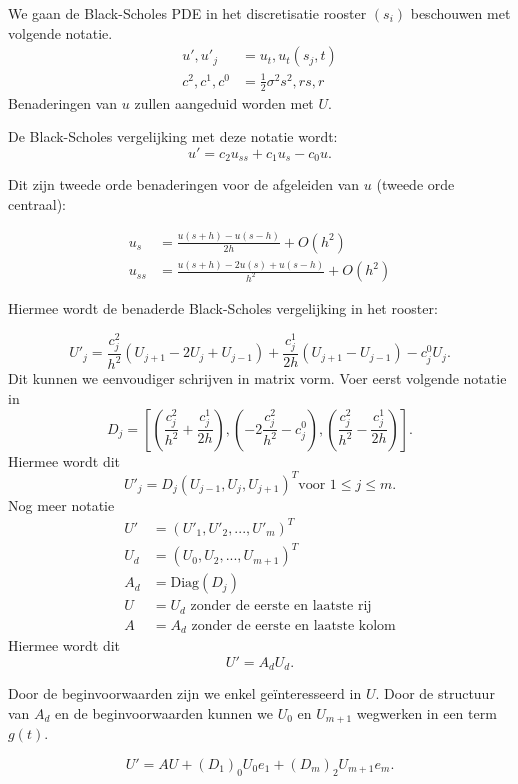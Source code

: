\documentclass{article}
\begin{document}

We gaan de Black-Scholes PDE in het
discretisatie rooster $(s_{i})$ beschouwen
met volgende notatie.
  \begin{align*}
    u',u'_{j}   &= u_{t},u_{t}(s_{j},t)\\
    c^{2},c^{1},c^{0}&= \frac{1}{2} \sigma^{2}s^{2}, rs , r  
  \end{align*}
 Benaderingen van $u$ zullen aangeduid worden met
 $U$.

De Black-Scholes vergelijking met deze notatie wordt:
\[
  u'= c_{2}u_{ss }+ c_{1}u_{s} -c_{0}u
.\]

Dit zijn tweede orde benaderingen voor de afgeleiden van $u$ (tweede orde centraal):

\begin{align*}
  u_{s}  &= \frac{u(s+h)-u(s-h)}{2h} + O(h^{2})\\
  u_{ss} &= \frac{u(s+h)-2u(s)+u(s-h)}{h^{2}} + O(h^{2})
\end{align*}

Hiermee wordt de benaderde Black-Scholes vergelijking
in het rooster:

\[
  U'_{j}= \frac{c_{j}^{2}}{h^{2}}(U_{j+1}-2U_{j}+ U_{j-1})
  + \frac{c_{j}^{1}}{2h}(U_{j+1}-U_{j-1})
  - c_{j}^{0}U_{j} 
.\]
Dit kunnen we eenvoudiger schrijven in matrix vorm.
Voer eerst volgende notatie in 
\[
    D_{j}=
  \left[
  \left(
  \frac{c_{j}^{2}}{h^{2}} + \frac{c_{j}^{1}}{2h}
  \right) ,
  \left(
  -2 \frac{c_{j}^{2}}{h^{2}}- c_{j}^{0}
  \right) ,
  \left(
  \frac{c_{j}^{2}}{h^{2}} - \frac{c_{j}^{1}}{2h} 
  \right) 
  \right]  .\]
Hiermee wordt dit
\[
U'_{j}=D_{j} \left( U_{j-1},U_{j}, U_{j+1} \right)^{T}
 \text{voor } 1 \le j \le m.\]
Nog meer notatie
\begin{align*}
  U' &= (U'_{1}, U'_{2}, ..., U'_{m})^{T}\\
  U_{d} &= (U_{0}, U_{2}, ..., U_{m+1})^{T}\\
  A_{d} &= \text{Diag}(D_{j})\\
  U &= U_{d}\text{ zonder de eerste en laatste rij } \\
  A &= A_{d}\text{ zonder de eerste en laatste kolom} 
\end{align*}
Hiermee wordt dit
\[
  U' = A_{d}U_{d}
.\]

Door de beginvoorwaarden zijn we enkel geïnteresseerd
in $U$. Door de structuur van $A_{d}$ en de 
beginvoorwaarden kunnen we $U_{0}$
en $U_{m+1}$ wegwerken in een term $g(t)$.

\[
  U' = AU + (D_{1})_{0}U_{0}e_{1} + (D_{m})_{2} U_{m+1} e_{m}
.\]
\end{document}
